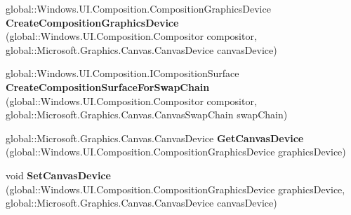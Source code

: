 \begin{DoxyCompactItemize}
\item 
\mbox{\label{interface_microsoft_1_1_graphics_1_1_canvas_1_1_u_i_1_1_composition_1_1_i_canvas_composition_statics_abc5bb79cc44eecbedc66ea29c5052d3d}} 
global\+::\+Windows.\+U\+I.\+Composition.\+Composition\+Graphics\+Device {\bfseries Create\+Composition\+Graphics\+Device} (global\+::\+Windows.\+U\+I.\+Composition.\+Compositor compositor, global\+::\+Microsoft.\+Graphics.\+Canvas.\+Canvas\+Device canvas\+Device)
\item 
\mbox{\label{interface_microsoft_1_1_graphics_1_1_canvas_1_1_u_i_1_1_composition_1_1_i_canvas_composition_statics_a6803bff12a2a0f2d9c35cdac60868b7b}} 
global\+::\+Windows.\+U\+I.\+Composition.\+I\+Composition\+Surface {\bfseries Create\+Composition\+Surface\+For\+Swap\+Chain} (global\+::\+Windows.\+U\+I.\+Composition.\+Compositor compositor, global\+::\+Microsoft.\+Graphics.\+Canvas.\+Canvas\+Swap\+Chain swap\+Chain)
\item 
\mbox{\label{interface_microsoft_1_1_graphics_1_1_canvas_1_1_u_i_1_1_composition_1_1_i_canvas_composition_statics_ad6745a005de8b7c161ff1c151591a3bb}} 
global\+::\+Microsoft.\+Graphics.\+Canvas.\+Canvas\+Device {\bfseries Get\+Canvas\+Device} (global\+::\+Windows.\+U\+I.\+Composition.\+Composition\+Graphics\+Device graphics\+Device)
\item 
\mbox{\label{interface_microsoft_1_1_graphics_1_1_canvas_1_1_u_i_1_1_composition_1_1_i_canvas_composition_statics_a3fce2ed9ef29897b92f51b815d0c42d7}} 
void {\bfseries Set\+Canvas\+Device} (global\+::\+Windows.\+U\+I.\+Composition.\+Composition\+Graphics\+Device graphics\+Device, global\+::\+Microsoft.\+Graphics.\+Canvas.\+Canvas\+Device canvas\+Device)
\item 
\mbox{\label{interface_microsoft_1_1_graphics_1_1_canvas_1_1_u_i_1_1_composition_1_1_i_canvas_composition_statics_a742fc5f5398406c730e6f87b2755b86a}} 

\end{DoxyCompactItemize}

